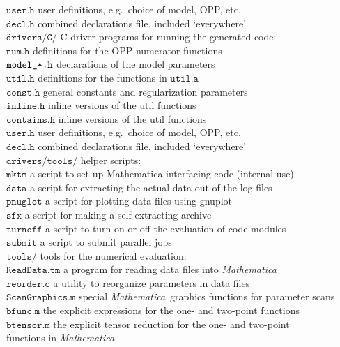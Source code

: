 \documentclass[twoside,11pt]{article}
\def\mma{\textit{Mathematica}}
\def\Code#1{\ensuremath{\texttt{#1}}}
\def\eg{e.g.\ }
\def\uscore{\symbol{95}}
\begin{document}
\begin{tabbing}
\quad\Code{user.h} \>
	user definitions, \eg choice of model, OPP, etc. \\
\quad\Code{decl.h} \>
	combined declarations file, included `everywhere'
\\[1ex]
\Code{drivers/C/} \>
	C driver programs for running the generated code: \\
\quad\Code{num.h} \>
	definitions for the OPP numerator functions \\
\quad\Code{model\uscore *.h} \>
	declarations of the model parameters \\
\quad\Code{util.h} \>
	definitions for the functions in \Code{util.a} \\
\quad\Code{const.h} \>
	general constants and regularization parameters \\
\quad\Code{inline.h} \>
	inline versions of the util functions \\
\quad\Code{contains.h} \>
	inline versions of the util functions \\
\quad\Code{user.h} \>
	user definitions, \eg choice of model, OPP, etc. \\
\quad\Code{decl.h} \>
	combined declarations file, included `everywhere'
\\[1ex]
\Code{drivers/tools/} \>
	helper scripts: \\
\quad\Code{mktm} \>
	a script to set up Mathematica interfacing code (internal use) \\
\quad\Code{data} \>
	a script for extracting the actual data out of the log files \\
\quad\Code{pnuglot} \>
	a script for plotting data files using gnuplot \\
\quad\Code{sfx} \>
	a script for making a self-extracting archive \\
\quad\Code{turnoff} \>
	a script to turn on or off the evaluation of code modules \\
\quad\Code{submit} \>
	a script to submit parallel jobs
\\[1ex]
\Code{tools/} \>
	tools for the numerical evaluation: \\
\quad\Code{ReadData.tm} \>
	a program for reading data files into \mma \\
\quad\Code{reorder.c} \>
	a utility to reorganize parameters in data files \\
\quad\Code{ScanGraphics.m} \>
	special \mma\ graphics functions for parameter scans \\
\quad\Code{bfunc.m} \>
	the explicit expressions for the one- and two-point functions \\
\quad\Code{btensor.m} \>
	the explicit tensor reduction for the one- and two-point \\
\>	functions in \mma
\end{tabbing}%
\end{document}
